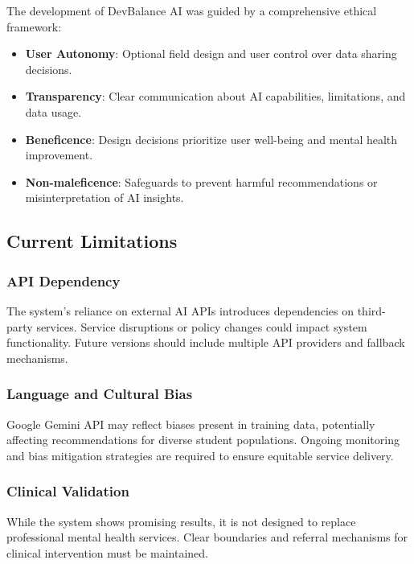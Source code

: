 \documentclass[conference,10pt]{IEEEtran}
\begin{document}
The development of DevBalance AI was guided by a comprehensive ethical framework:

\begin{itemize}
\item \textbf{User Autonomy}: Optional field design and user control over data sharing decisions.

\item \textbf{Transparency}: Clear communication about AI capabilities, limitations, and data usage.

\item \textbf{Beneficence}: Design decisions prioritize user well-being and mental health improvement.

\item \textbf{Non-maleficence}: Safeguards to prevent harmful recommendations or misinterpretation of AI insights.
\end{itemize}

\subsection{Current Limitations}

\subsubsection{API Dependency}

The system's reliance on external AI APIs introduces dependencies on third-party services. Service disruptions or policy changes could impact system functionality. Future versions should include multiple API providers and fallback mechanisms.

\subsubsection{Language and Cultural Bias}

Google Gemini API may reflect biases present in training data, potentially affecting recommendations for diverse student populations. Ongoing monitoring and bias mitigation strategies are required to ensure equitable service delivery.

\subsubsection{Clinical Validation}

While the system shows promising results, it is not designed to replace professional mental health services. Clear boundaries and referral mechanisms for clinical intervention must be maintained.
\end{document}
